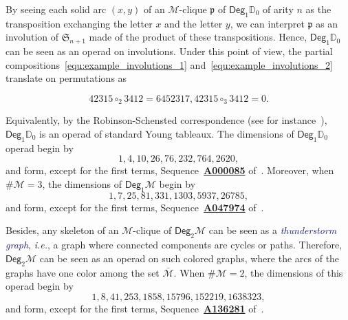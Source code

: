 \documentclass[10pt,reqno]{amsart}
\numberwithin{equation}{subsection}
\newcommand{\Mca}{\mathcal{M}}
\newcommand{\Dbb}{\mathbb{D}}
\newcommand{\Pfr}{\mathfrak{p}}
\newcommand{\Deg}{\mathsf{Deg}}
\newcommand{\Def}[1]{\textcolor{MidnightBlue}{\em #1}}
\newcommand{\OEIS}[1]{\href{http://oeis.org/#1}{{\bf #1}}}
\begin{document}
By seeing each solid arc $(x, y)$ of an $\Mca$-clique $\Pfr$ of
$\Deg_1\Dbb_0$ of arity $n$ as the transposition exchanging the letter
$x$ and the letter $y$, we can interpret $\Pfr$ as an involution of
$\mathfrak{S}_{n + 1}$ made of the product of these transpositions.
Hence, $\Deg_1\Dbb_0$ can be seen as an operad on involutions. Under
this point of view, the partial
compositions~\eqref{equ:example_involutions_1}
and~\eqref{equ:example_involutions_2} translate on permutations as
\vspace{-1.75em}
\begin{multicols}{2}
\begin{subequations}
\begin{equation}
    42315 \circ_2 3412 = 6452317,
\end{equation}

\begin{equation}
    42315 \circ_3 3412 = 0.
\end{equation}
\end{subequations}
\end{multicols}
\noindent Equivalently, by the Robinson-Schensted correspondence (see
for instance~\cite{Lot02}), $\Deg_1\Dbb_0$ is an operad of standard Young
tableaux. The dimensions of $\Deg_1\Dbb_0$ operad begin by
\begin{equation}
    1, 4, 10, 26, 76, 232, 764, 2620,
\end{equation}
and form, except for the first terms, Sequence~\OEIS{A000085}
of~\cite{Slo}.
Moreover, when $\# \Mca = 3$, the dimensions of
$\Deg_1\Mca$ begin by
\begin{equation}
    1, 7, 25, 81, 331, 1303, 5937, 26785,
\end{equation}
and form, except for the first terms, Sequence~\OEIS{A047974}
of~\cite{Slo}.
\medskip

Besides, any skeleton of an $\Mca$-clique of $\Deg_2\Mca$ can be seen as
a \Def{thunderstorm graph}, {\em i.e.}, a graph where connected
components are cycles or paths. Therefore, $\Deg_2\Mca$ can be seen as
an operad on such colored graphs, where the arcs of the graphs have one
color among the set $\bar{\Mca}$. When $\# \Mca = 2$, the
dimensions of this operad begin by
\begin{equation}
    1, 8, 41, 253, 1858, 15796, 152219, 1638323,
\end{equation}
and form, except for the first terms, Sequence~\OEIS{A136281}
of~\cite{Slo}.
\medskip

\end{document}

